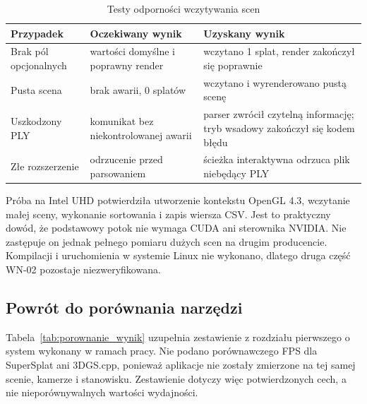 \begin{table}[htbp]
  \centering
  \caption{Testy odporności wczytywania scen}
  \label{tab:testy_odpornosci}
  \small
  \renewcommand{\arraystretch}{1.15}
  \begin{tabularx}{\textwidth}{
      >{\raggedright\arraybackslash}p{}
      >{\raggedright\arraybackslash}p{}
      >{\raggedright\arraybackslash}X}
    \toprule
    \textbf{Przypadek} & \textbf{Oczekiwany wynik} & \textbf{Uzyskany wynik} \\
    \midrule
    Brak pól opcjonalnych & wartości domyślne i poprawny render & wczytano 1 splat, render zakończył się poprawnie \\
    Pusta scena & brak awarii, 0 splatów & wczytano i wyrenderowano pustą scenę \\
    Uszkodzony PLY & komunikat bez niekontrolowanej awarii & parser zwrócił czytelną informację; tryb wsadowy zakończył się kodem błędu \\
    Złe rozszerzenie & odrzucenie przed parsowaniem & ścieżka interaktywna odrzuca plik niebędący PLY \\
    \bottomrule
  \end{tabularx}
\end{table}

Próba na Intel UHD potwierdziła utworzenie kontekstu OpenGL 4.3, wczytanie małej sceny, wykonanie sortowania i zapis wiersza CSV. Jest to praktyczny dowód, że podstawowy potok nie wymaga CUDA ani sterownika NVIDIA. Nie zastępuje on jednak pełnego pomiaru dużych scen na drugim producencie. Kompilacji i uruchomienia w systemie Linux nie wykonano, dlatego druga część WN-02 pozostaje niezweryfikowana.

\subsection{Powrót do porównania narzędzi}

Tabela~\ref{tab:porownanie_wynik} uzupełnia zestawienie z rozdziału pierwszego o system wykonany w ramach pracy. Nie podano porównawczego FPS dla SuperSplat ani 3DGS.cpp, ponieważ aplikacje nie zostały zmierzone na tej samej scenie, kamerze i stanowisku. Zestawienie dotyczy więc potwierdzonych cech, a nie nieporównywalnych wartości wydajności.

